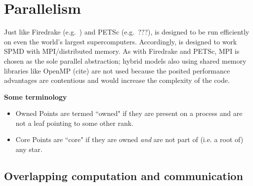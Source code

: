 \documentclass[thesis]{subfiles}
\begin{document}

\chapter{Parallelism}
\label{chapter:parallel}

Just like Firedrake (e.g.~\cite{betteridgeCodeGenerationProductive2021}) and PETSc (e.g.~???),  is designed to be run efficiently on even the world's largest supercomputers.
Accordingly,  is designed to work SPMD with MPI/distributed memory.
As with Firedrake and PETSc, MPI is chosen as the sole parallel abstraction; hybrid models also using shared memory libraries like OpenMP (cite) are not used because the posited performance advantages are contentious \parencite{knepleyExascaleComputingThreads2015} and would increase the complexity of the code.

\textbf{Some terminology}

\begin{itemize}
  \item Owned
    Points are termed ``owned" if they are present on a process and are not a leaf pointing to some other rank.
  \item Core
    Points are ``core" if they are owned \textit{and} are not part of (i.e. a root of) any star.
\end{itemize}


\section{Overlapping computation and communication}

\end{document}
